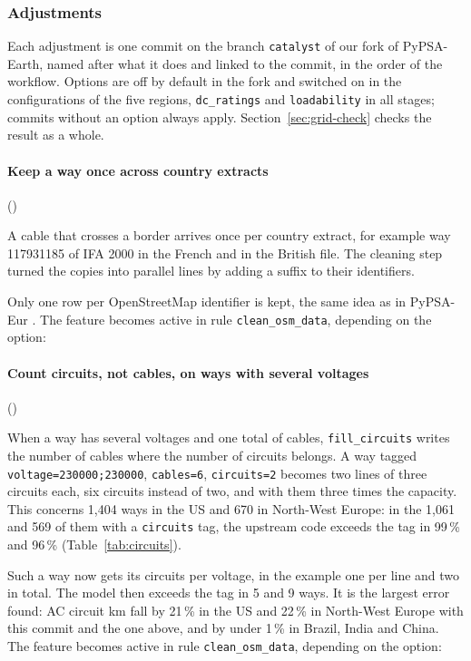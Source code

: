 \FloatBarrier
\subsubsection{Adjustments}\label{sec:grid-adjust}

Each adjustment is one commit on the branch \texttt{catalyst} of our fork of PyPSA-Earth, named after what it does and linked to the commit, in the order of the workflow.
Options are off by default in the fork and switched on in the configurations of the five regions, \texttt{dc\_ratings} and \texttt{loadability} in all stages; commits without an option always apply.
Section~\ref{sec:grid-check} checks the result as a whole.

\paragraph{Keep a way once across country extracts} ()

A cable that crosses a border arrives once per country extract, for example way 117931185 of IFA 2000 in the French and in the British file.
The cleaning step turned the copies into parallel lines by adding a suffix to their identifiers.

Only one row per OpenStreetMap identifier is kept, the same idea as in PyPSA-Eur \citep{horsch2018pypsa}.
The feature becomes active in rule \texttt{clean\_osm\_data}, depending on the option:

\paragraph{Count circuits, not cables, on ways with several voltages} ()

When a way has several voltages and one total of cables, \texttt{fill\_circuits} writes the number of cables where the number of circuits belongs.
A way tagged \texttt{voltage=230000;230000}, \texttt{cables=6}, \texttt{circuits=2} becomes two lines of three circuits each, six circuits instead of two, and with them three times the capacity.
This concerns 1,404 ways in the US and 670 in North-West Europe: in the 1,061 and 569 of them with a \texttt{circuits} tag, the upstream code exceeds the tag in 99\,\% and 96\,\% (Table~\ref{tab:circuits}).

Such a way now gets its circuits per voltage, in the example one per line and two in total.
The model then exceeds the tag in 5 and 9 ways.
It is the largest error found: AC circuit km fall by 21\,\% in the US and 22\,\% in North-West Europe with this commit and the one above, and by under 1\,\% in Brazil, India and China.
The feature becomes active in rule \texttt{clean\_osm\_data}, depending on the option:

